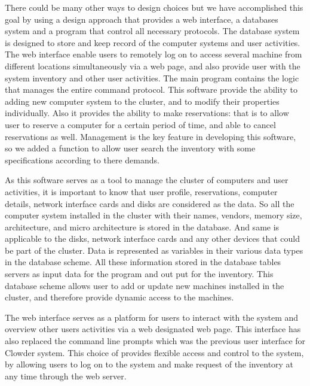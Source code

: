 	
There could be many other ways to design choices but we have accomplished this goal by using a design approach that provides a web interface, a databases system and a program that control all necessary protocols. The database system is designed to store and keep record of the computer systems and user activities. The web interface enable users to remotely log on to access  several machine from different locations simultaneously via a web page, and also provide user with the system inventory and other user activities. The main program contains the logic that manages the entire command protocol. This  software provide the ability to adding new computer system to the cluster, and to modify their properties individually. Also it provides the ability to make reservations: that is to allow user to reserve a computer for a certain period of time, and able to cancel reservations as well. Management is the key feature in developing this software, so we added a function to allow user search the inventory with some specifications according to there demands.   
	

As this software serves as a tool to manage the cluster of computers and user activities, it is important to know that user profile, reservations, computer details, network interface cards and disks are considered as the data. So all the computer system installed in the cluster with their names, vendors, memory size, architecture, and micro architecture is stored in the database. And same is applicable to the disks, network interface cards and any other devices that could be part of the cluster. Data is represented as variables in their various data types in the database scheme.  All these information stored in the database tables servers as input  data for the program and out put for the inventory. This database scheme allows user to add or update new machines installed in the cluster, and therefore provide dynamic access to the machines. 

The web interface serves as a platform for users to interact with the system and overview other users activities via a web designated web page. This interface has also replaced the command line prompts which was the previous user interface for Clowder system. This choice of provides flexible access and control to the system, by allowing users to log on to the system and make request of the inventory at any time through the web server.

	
\label{chap:intro}